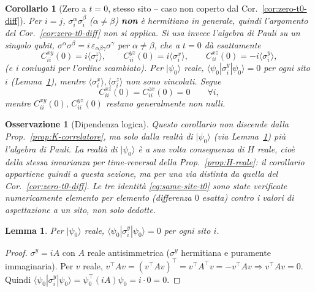 \documentclass[11pt,a4paper]{article}
\newtheorem{lemma}{Lemma}
\newtheorem{corollario}{Corollario}
\newtheorem{osservazione}{Osservazione}
\begin{document}
\begin{corollario}[Zero a $t=0$, stesso sito -- caso non coperto dal Cor.~\ref{cor:zero-t0-diff}]
\label{cor:zero-t0-same}
Per $i=j$, $\sigma_i^\alpha\sigma_i^\beta$ ($\alpha\neq\beta$) \textbf{non} è hermitiano in
generale, quindi l'argomento del Cor.~\ref{cor:zero-t0-diff} non si applica. Si usa invece
l'algebra di Pauli su un singolo qubit, $\sigma^\alpha\sigma^\beta=i\,\varepsilon_{\alpha\beta
\gamma}\sigma^\gamma$ per $\alpha\neq\beta$, che a $t=0$ dà esattamente
\begin{equation}
C_{ii}^{xy}(0)=i\langle\sigma_i^z\rangle,\qquad
C_{ii}^{yz}(0)=i\langle\sigma_i^x\rangle,\qquad
C_{ii}^{xz}(0)=-i\langle\sigma_i^y\rangle,
\label{eq:same-site-t0}
\end{equation}
(e i coniugati per l'ordine scambiato). Per $|\psi_0\rangle$ reale,
$\langle\psi_0|\sigma_i^y|\psi_0\rangle=0$ per ogni sito $i$ (Lemma~\ref{lem:sigma-y-reale}),
mentre $\langle\sigma_i^x\rangle,\langle\sigma_i^z\rangle$ non sono vincolati. Segue
\begin{equation}
C_{ii}^{xz}(0)=C_{ii}^{zx}(0)=0\qquad\forall i,
\end{equation}
mentre $C_{ii}^{xy}(0),\,C_{ii}^{yz}(0)$ restano generalmente non nulli.
\end{corollario}
\begin{osservazione}[Dipendenza logica]
Questo corollario non discende dalla Prop.~\ref{prop:K-correlatore}, ma solo dalla
\emph{realtà} di $|\psi_0\rangle$ (via Lemma~\ref{lem:sigma-y-reale}) più l'algebra di Pauli. La
realtà di $|\psi_0\rangle$ è a sua volta conseguenza di $H$ reale, cioè della stessa invarianza
per time-reversal della Prop.~\ref{prop:H-reale}: il corollario appartiene quindi a questa
sezione, ma per una via distinta da quella del Cor.~\ref{cor:zero-t0-diff}. Le tre identità
\eqref{eq:same-site-t0} sono state verificate numericamente elemento per elemento (differenza
$0$ esatta) contro i valori di aspettazione a un sito, non solo dedotte.
\end{osservazione}

\begin{lemma}
\label{lem:sigma-y-reale}
Per $|\psi_0\rangle$ reale, $\langle\psi_0|\sigma_i^y|\psi_0\rangle=0$ per ogni sito $i$.
\end{lemma}
\begin{proof}
$\sigma^y=iA$ con $A$ reale antisimmetrica ($\sigma^y$ hermitiana e puramente immaginaria).
Per $v$ reale, $v^\top A v=(v^\top A v)^\top=v^\top A^\top v=-v^\top A v\Rightarrow v^\top Av=0$.
Quindi $\langle\psi_0|\sigma_i^y|\psi_0\rangle=\psi_0^\top(iA)\psi_0=i\cdot0=0$.
\end{proof}
\end{document}
